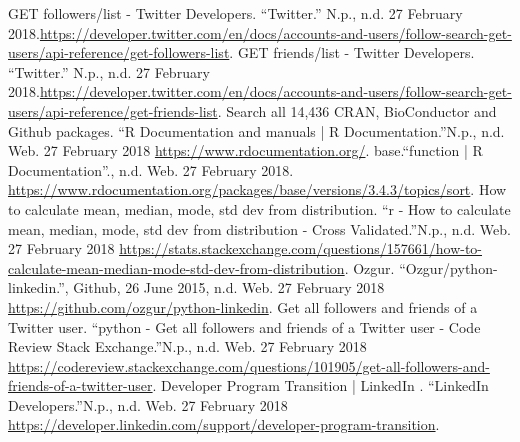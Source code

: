 \documentclass[letterpaper,11pt]{article}
\begin{document}
\begin{thebibliography}{9}
GET followers/list - Twitter Developers. ``Twitter.'' N.p., n.d. 27 February 2018.\url{https://developer.twitter.com/en/docs/accounts-and-users/follow-search-get-users/api-reference/get-followers-list}.
GET friends/list - Twitter Developers. ``Twitter.'' N.p., n.d. 27 February 2018.\url{https://developer.twitter.com/en/docs/accounts-and-users/follow-search-get-users/api-reference/get-friends-list}.
Search all 14,436 CRAN, BioConductor and Github packages. ``R Documentation and manuals | R Documentation.''N.p., n.d. Web. 27 February 2018 \url{https://www.rdocumentation.org/}.
base.``function | R Documentation''., n.d. Web. 27  February 2018. \url{https://www.rdocumentation.org/packages/base/versions/3.4.3/topics/sort}.
How to calculate mean, median, mode, std dev from distribution. ``r - How to calculate mean, median, mode, std dev from distribution - Cross Validated.''N.p., n.d. Web. 27 February 2018 \url{https://stats.stackexchange.com/questions/157661/how-to-calculate-mean-median-mode-std-dev-from-distribution}.
Ozgur. ``Ozgur/python-linkedin.'', Github, 26 June 2015, n.d. Web. 27 February 2018 \url{https://github.com/ozgur/python-linkedin}.
Get all followers and friends of a Twitter user. ``python - Get all followers and friends of a Twitter user - Code Review Stack Exchange.''N.p., n.d. Web. 27 February 2018 \url{https://codereview.stackexchange.com/questions/101905/get-all-followers-and-friends-of-a-twitter-user}.
Developer Program Transition | LinkedIn . ``LinkedIn Developers.''N.p., n.d. Web. 27 February 2018 \url{https://developer.linkedin.com/support/developer-program-transition}.

\end{thebibliography}
\end{document}
